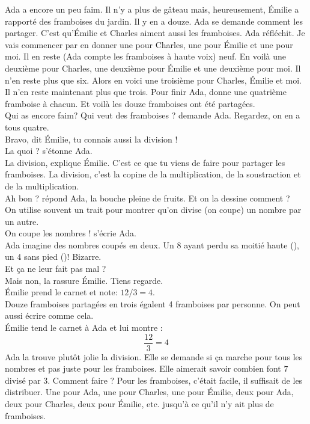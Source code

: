 Ada a encore un peu faim.
Il n'y a plus de gâteau mais, heureusement, Émilie a rapporté des framboises du jardin.
Il y en a douze. Ada se demande comment les partager. 
C'est qu'Émilie et Charles aiment aussi les framboises. 
Ada réfléchit. Je vais commencer par en donner une pour Charles, une pour Émilie et une pour moi. 
Il en reste (Ada compte les framboises à haute voix) neuf. 
En voilà une deuxième pour Charles, une deuxième pour Émilie et une deuxième pour moi. Il n'en reste plus que six. 
Alors en voici une troisième pour Charles, Émilie et moi. Il n'en reste maintenant plus que trois. 
Pour finir Ada, donne une quatrième framboise à chacun. Et voilà les douze framboises ont été partagées.\\
\guillemotleft Qui as encore faim? Qui veut des framboises ? demande Ada. Regardez, on en a tous quatre.\\
\mdash Bravo, dit Émilie, tu connais aussi la division !\\
\mdash La quoi ? s'étonne Ada.\\
\mdash La division, explique Émilie. C'est ce que tu viens de faire pour partager les framboises. La division, c'est la copine de la multiplication, de la soustraction et de la multiplication.\\
\mdash Ah bon ? répond Ada, la bouche pleine de fruits. Et on la dessine comment ?\\
\mdash On utilise souvent un trait pour montrer qu'on divise (on coupe) un nombre par un autre.\\ 
\mdash On coupe les nombres ! s'écrie Ada. \guillemotright\\
Ada imagine des nombres coupés en deux. Un $8$ ayant perdu sa moitié haute (), un $4$ sans pied ()! Bizarre.\\
\guillemotleft Et ça ne leur fait pas mal ?\\
\mdash Mais non, la rassure Émilie. Tiens regarde. \guillemotright\\
Émilie prend le carnet et note: $12/3=4$.\\
\guillemotleft Douze framboises partagées en trois égalent 4 framboises par personne. On peut aussi écrire comme cela. \guillemotright\\
Émilie tend le carnet à Ada et lui montre : 
$$\frac{12}{3}=4$$
Ada la trouve plutôt jolie la division. Elle se demande si ça marche pour tous les nombres et pas juste pour les framboises. 
Elle aimerait savoir combien font $7$ divisé par $3$. Comment faire ? Pour les framboises, c'était facile, il suffisait de les distribuer. Une pour Ada, une pour Charles, une pour Émilie, deux pour Ada, deux pour Charles, deux pour Émilie, etc. jusqu'à ce qu'il n'y ait plus de framboises. 
